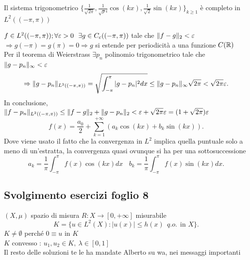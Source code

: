 \documentclass[12px]{article}
\begin{document}
	\begin{teo}
		Il sistema trigonometrico $\{\frac{1}{\sqrt{2\pi}},\frac{1}{\sqrt pi}\cos(kx), \frac {1}{\sqrt 2}\sin(kx)\}_{k\geq 1}$  è completo in  $L^2((-\pi,\pi))$
	\end{teo}
	\begin{dimo}
		$f\in L^2((-\pi,\pi)); \forall \e > 0 \ \ \exists g\in C_c((-\pi,\pi))$ tale che  $\|f-g\|_2<\varepsilon$\\
		 $ \Rightarrow g(-\pi) = g(\pi) = 0 \Rightarrow g$ si estende per periodicità a una funzione $C(\mathbb{R})$\\
		 Per il teorema di Weierstrass  $\exists p_n$ polinomio trigonometrico tale che  $\|g-p_n\|_\infty < \varepsilon$\
		  \[
		  \Rightarrow  \|g-p_n\|_{L^2((-\pi,\pi))} = \sqrt{\int_{-\pi}^\pi|g-p_n|^2dx}\leq \|g-p_n\|_\infty\sqrt{2\pi} < \sqrt{2\pi}\varepsilon
		 .\] 
		 In conclusione, $\|f-p_n\|_{L^2((-\pi,\pi))}\leq\|f-g\|_2 + \|g-p_n\|_2 < \varepsilon + \sqrt{ 2\pi}\varepsilon= (1 + \sqrt{2\pi})\varepsilon$ \\
			 \[
			 f(x) = \frac{a_0}{2} + \sum^{+\infty}_{k=1} \left(a_k \cos(kx) + b_k\sin(kx) \right)
			.\] 
		 Dove viene usato il fatto che la convergenza in $L^2$ implica quella puntuale solo a meno di un'estratta, la convergenza quasi ovunque si ha per una sottosuccessione\\
		  \[
		  a_k = \frac 1\pi\int_{-\pi}^\pi f(x)\cos(kx)dx\ \ \ \ b_k = \frac 1 \pi\int_{-\pi}^\pi f(x) \sin(kx) dx
		 .\] 
	\end{dimo}
	\subsection{Svolgimento esercizi foglio 8}
	$(X,\mu)$ spazio di misura
	$R: X \rightarrow [0,+\infty] $ misurabile\\
	\[
		K = \{u\in L^2(X): |u(x)| \leq h(x) \ \ q.o.\ \ \text{in }X\}
	.\] 
	$K\neq \emptyset$ perché  $0\equiv u$ in  $K$\\
	$K$ convesso :  $u_1,u_2\in K, \ \lambda\in[0,1]$\\
	Il resto delle soluzioni te le ha mandate Alberto su wa, nei messaggi importanti
\end{document}

